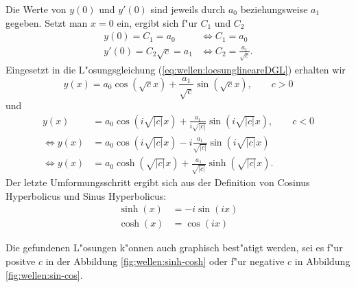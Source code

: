 Die Werte von $y(0)$ und $y'(0)$ sind jeweils durch $a_0$ beziehungsweise $a_1$ 
gegeben. Setzt man $x = 0$ ein, ergibt sich f"ur $C_1$ und $C_2$
\begin{equation}
	\begin{split}
		y(0) = C_1 = a_0 &\Leftrightarrow C_1 = a_0 \\
		y'(0) = C_2 \sqrt{c} = a_1 &\Leftrightarrow C_2 = \frac{a_1}{\sqrt{c}}.
	\end{split}
\end{equation}
Eingesetzt in die L"osungsgleichung (\ref{eq:wellen:loesunglineareDGL}) 
erhalten wir
\begin{equation*}
	y(x) = a_0 \cos(\sqrt{c}x) + \frac{a_1}{\sqrt{c}} \sin(\sqrt{c}x), \qquad c 
	> 0
\end{equation*}
und
\begin{equation}
	\begin{split}
		y(x) &= a_0 \cos(i\sqrt{|c|}x) + 
		\frac{a_1}{i\sqrt{|c|}}\sin(i\sqrt{|c|}x), \qquad c < 0\\
		\Leftrightarrow
		y(x) &= a_0 \cos(i\sqrt{|c|}x) - 
		i\frac{a_1}{\sqrt{|c|}}\sin(i\sqrt{|c|}x)\\
		\Leftrightarrow
		y(x) &= a_0 \cosh(\sqrt{|c|}x) + 
		\frac{a_1}{\sqrt{|c|}}\sinh(\sqrt{|c|}x).
	\end{split}	
\end{equation}
Der letzte Umformungsschritt ergibt sich aus der Definition von Cosinus 
Hyperbolicus und Sinus Hyperbolicus:
\begin{equation*}
	\begin{split}
		\sinh(x) &= -i \sin(ix)\\
		\cosh(x) &= \cos (ix)
	\end{split}
\end{equation*}

Die gefundenen L"osungen k"onnen auch graphisch best"atigt werden, sei es f"ur 
positve $c$ in der Abbildung \ref{fig:wellen:sinh-cosh} oder f"ur negative $c$ 
in Abbildung \ref{fig:wellen:sin-cos}.

